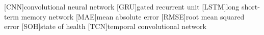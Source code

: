 [CNN]{convolutional neural network}
[GRU]{gated recurrent unit}
[LSTM]{long short-term memory network}
[MAE]{mean absolute error}
[RMSE]{root mean squared error}
[SOH]{state of health}
[TCN]{temporal convolutional network}
